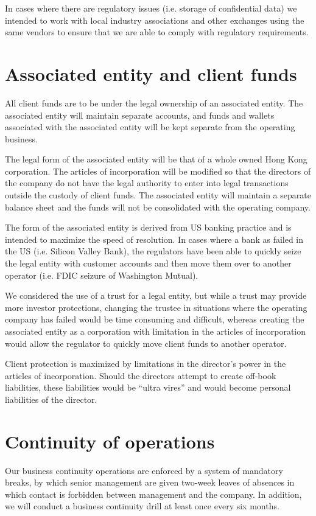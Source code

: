 In cases where there are regulatory issues (i.e. storage of
confidential data) we intended to work with local industry
associations and other exchanges using the same vendors to ensure that
we are able to comply with regulatory requirements.

\section{Associated entity and client funds}
All client funds are to be under the legal ownership of an associated
entity.  The associated entity will maintain separate accounts, and
funds and wallets associated with the associated entity will be kept
separate from the operating business.

The legal form of the associated entity will be that of a whole owned
Hong Kong corporation.  The articles of incorporation will be modified
so that the directors of the company do not have the legal authority
to enter into legal transactions outside the custody of client
funds.  The associated entity will maintain a separate balance sheet
and the funds will not be consolidated with the operating company.

The form of the associated entity is derived from US banking practice
and is intended to maximize the speed of resolution.  In cases where a
bank as failed in the US (i.e. Silicon Valley Bank), the regulators
have been able to quickly seize the legal entity with customer
accounts and then move them over to another operator (i.e. FDIC
seizure of Washington Mutual).

We considered the use of a trust for a legal entity, but while a trust
may provide more investor protections, changing the trustee in
situations where the operating company has failed would be time
consuming and difficult, whereas creating the associated entity as a
corporation with limitation in the articles of incorporation would
allow the regulator to quickly move client funds to another operator.

Client protection is maximized by limitations in the director's power
in the articles of incorporation.  Should the directors attempt to
create off-book liabilities, these liabilities would be ``ultra
vires'' and would become personal liabilities of the director.

\section{Continuity of operations}
Our business continuity operations are enforced by a system of
mandatory breaks, by which senior management are given two-week leaves
of absences in which contact is forbidden between management and the
company.  In addition, we will conduct a business continuity drill at
least once every six months.

